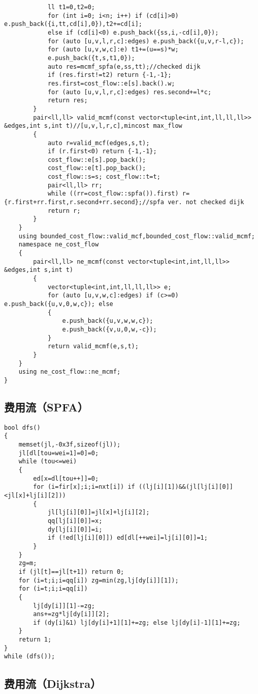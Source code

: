 \documentclass[12pt]{ctexart}
\begin{document}
\begin{lstlisting}
			ll t1=0,t2=0;
			for (int i=0; i<n; i++) if (cd[i]>0) e.push_back({i,tt,cd[i],0}),t2+=cd[i];
			else if (cd[i]<0) e.push_back({ss,i,-cd[i],0});
			for (auto [u,v,l,r,c]:edges) e.push_back({u,v,r-l,c});
			for (auto [u,v,w,c]:e) t1+=(u==s)*w;
			e.push_back({t,s,t1,0});
			auto res=mcmf_spfa(e,ss,tt);//checked dijk
			if (res.first!=t2) return {-1,-1};
			res.first=cost_flow::e[s].back().w;
			for (auto [u,v,l,r,c]:edges) res.second+=l*c;
			return res;
		}
		pair<ll,ll> valid_mcmf(const vector<tuple<int,int,ll,ll,ll>> &edges,int s,int t)//[u,v,l,r,c],mincost max_flow
		{
			auto r=valid_mcf(edges,s,t);
			if (r.first<0) return {-1,-1};
			cost_flow::e[s].pop_back();
			cost_flow::e[t].pop_back();
			cost_flow::s=s; cost_flow::t=t;
			pair<ll,ll> rr;
			while ((rr=cost_flow::spfa()).first) r={r.first+rr.first,r.second+rr.second};//spfa ver. not checked dijk
			return r;
		}
	}
	using bounded_cost_flow::valid_mcf,bounded_cost_flow::valid_mcmf;
	namespace ne_cost_flow
	{
		pair<ll,ll> ne_mcmf(const vector<tuple<int,int,ll,ll>> &edges,int s,int t)
		{
			vector<tuple<int,int,ll,ll,ll>> e;
			for (auto [u,v,w,c]:edges) if (c>=0) e.push_back({u,v,0,w,c}); else
			{
				e.push_back({u,v,w,w,c});
				e.push_back({v,u,0,w,-c});
			}
			return valid_mcmf(e,s,t);
		}
	}
	using ne_cost_flow::ne_mcmf;
}
\end{lstlisting}

\subsection{费用流（SPFA）}

\begin{lstlisting}
bool dfs()
{
	memset(jl,-0x3f,sizeof(jl));
	jl[dl[tou=wei=1]=0]=0;
	while (tou<=wei)
	{
		ed[x=dl[tou++]]=0;
		for (i=fir[x];i;i=nxt[i]) if ((lj[i][1])&&(jl[lj[i][0]]<jl[x]+lj[i][2]))
		{
			jl[lj[i][0]]=jl[x]+lj[i][2];
			qq[lj[i][0]]=x;
			dy[lj[i][0]]=i;
			if (!ed[lj[i][0]]) ed[dl[++wei]=lj[i][0]]=1;
		}
	}
	zg=m;
	if (jl[t]==jl[t+1]) return 0;
	for (i=t;i;i=qq[i]) zg=min(zg,lj[dy[i]][1]);
	for (i=t;i;i=qq[i])
	{
		lj[dy[i]][1]-=zg;
		ans+=zg*lj[dy[i]][2];
		if (dy[i]&1) lj[dy[i]+1][1]+=zg; else lj[dy[i]-1][1]+=zg;
	}
	return 1;
}
while (dfs());
\end{lstlisting}

\subsection{费用流（Dijkstra）}
\end{document}
